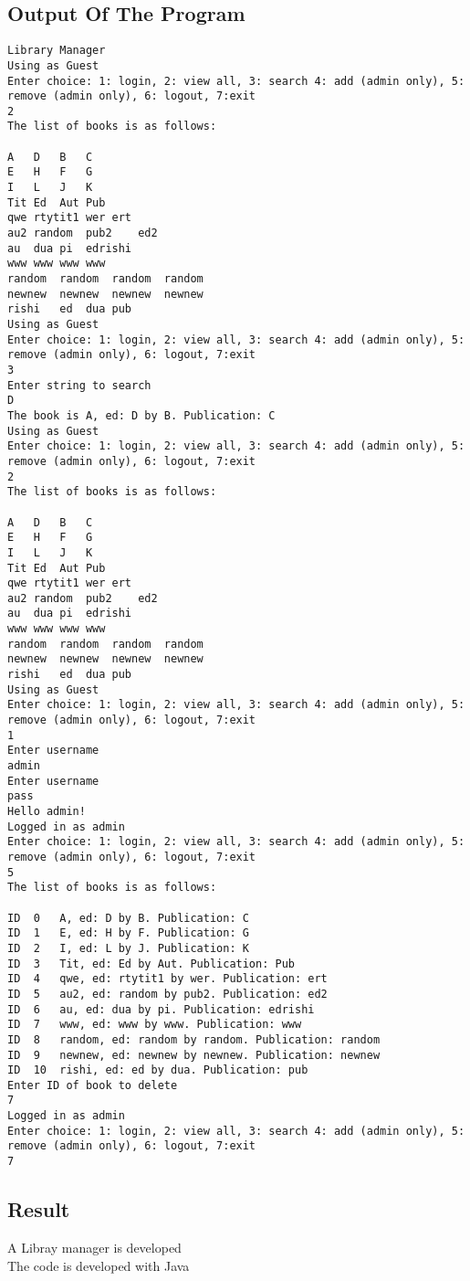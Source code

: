 \documentclass[paper=a4, fontsize=11pt]{scrartcl} %
\numberwithin{equation}{section} %
\numberwithin{figure}{section} %
\numberwithin{table}{section} %
\begin{document}
\subsection{Output Of The Program}
\begin{verbatim}
Library Manager
Using as Guest
Enter choice: 1: login, 2: view all, 3: search 4: add (admin only), 5: remove (admin only), 6: logout, 7:exit
2
The list of books is as follows:

A	D	B	C
E	H	F	G
I	L	J	K
Tit	Ed	Aut	Pub
qwe	rtytit1	wer	ert
au2	random	pub2	ed2
au	dua	pi	edrishi
www	www	www	www
random	random	random	random
newnew	newnew	newnew	newnew
rishi	ed	dua	pub
Using as Guest
Enter choice: 1: login, 2: view all, 3: search 4: add (admin only), 5: remove (admin only), 6: logout, 7:exit
3
Enter string to search
D
The book is A, ed: D by B. Publication: C
Using as Guest
Enter choice: 1: login, 2: view all, 3: search 4: add (admin only), 5: remove (admin only), 6: logout, 7:exit
2
The list of books is as follows:

A	D	B	C
E	H	F	G
I	L	J	K
Tit	Ed	Aut	Pub
qwe	rtytit1	wer	ert
au2	random	pub2	ed2
au	dua	pi	edrishi
www	www	www	www
random	random	random	random
newnew	newnew	newnew	newnew
rishi	ed	dua	pub
Using as Guest
Enter choice: 1: login, 2: view all, 3: search 4: add (admin only), 5: remove (admin only), 6: logout, 7:exit
1
Enter username
admin
Enter username
pass
Hello admin!
Logged in as admin
Enter choice: 1: login, 2: view all, 3: search 4: add (admin only), 5: remove (admin only), 6: logout, 7:exit
5
The list of books is as follows:

ID	0	A, ed: D by B. Publication: C
ID	1	E, ed: H by F. Publication: G
ID	2	I, ed: L by J. Publication: K
ID	3	Tit, ed: Ed by Aut. Publication: Pub
ID	4	qwe, ed: rtytit1 by wer. Publication: ert
ID	5	au2, ed: random by pub2. Publication: ed2
ID	6	au, ed: dua by pi. Publication: edrishi
ID	7	www, ed: www by www. Publication: www
ID	8	random, ed: random by random. Publication: random
ID	9	newnew, ed: newnew by newnew. Publication: newnew
ID	10	rishi, ed: ed by dua. Publication: pub
Enter ID of book to delete
7
Logged in as admin
Enter choice: 1: login, 2: view all, 3: search 4: add (admin only), 5: remove (admin only), 6: logout, 7:exit
7

\end{verbatim}
\subsection{Result}
A Libray manager is developed\\
The code is developed with Java\\
\end{document}
